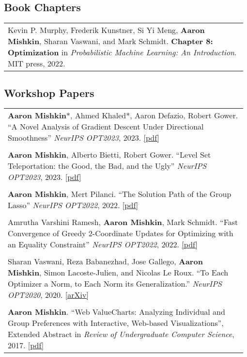 \documentclass[10pt]{article}
\begin{document}
\subsection*{Book Chapters}

\begin{longtable}{L{0.98\linewidth}}
    Kevin P.
    Murphy, Frederik Kunstner, Si Yi Meng, \textbf{Aaron Mishkin}, Sharan Vaswani,
    and Mark Schmidt.
    \textbf{Chapter 8: Optimization} in \textit{Probabilistic Machine Learning: An
        Introduction}.
    MIT press, 2022.
\end{longtable}

\subsection*{Workshop Papers}

\begin{longtable}{L{0.98\linewidth}}
    \textbf{Aaron Mishkin}*, Ahmed Khaled*, Aaron Defazio, Robert Gower. ``A Novel Analysis of Gradient Descent Under Directional Smoothness'' \textit{NeurIPS OPT2023}, 2023. \href{https://opt-ml.org/papers/2023/paper77.pdf}{[pdf]} \\  \\
    \textbf{Aaron Mishkin}, Alberto Bietti, Robert Gower. ``Level Set Teleportation: the Good, the Bad, and the Ugly'' \textit{NeurIPS OPT2023}, 2023. \href{https://opt-ml.org/papers/2023/paper35.pdf}{[pdf]}                         \\  \\
    \textbf{Aaron Mishkin}, Mert Pilanci. ``The Solution Path of the Group Lasso'' \textit{NeurIPS OPT2022}, 2022. \href{https://opt-ml.org/papers/2022/paper63.pdf}{[pdf]}                                                             \\  \\
    Amrutha Varshini Ramesh, \textbf{Aaron Mishkin}, Mark Schmidt.
    ``Fast Convergence of Greedy 2-Coordinate Updates for Optimizing with an Equality Constraint'' \textit{NeurIPS OPT2022}, 2022. \href{https://opt-ml.org/papers/2022/paper82.pdf}{[pdf]}                                             \\  \\
    Sharan Vaswani, Reza Babanezhad, Jose Gallego, \textbf{Aaron Mishkin}, Simon
    Lacoste-Julien, and Nicolas Le Roux.
    ``To Each Optimizer a Norm, to Each Norm its Generalization.'' \textit{NeurIPS OPT2020}, 2020. \href{https://arxiv.org/abs/2006.06821}{[arXiv]}                                                                                     \\  \\
    \textbf{Aaron Mishkin}. ``Web ValueCharts: Analyzing Individual and Group Preferences with Interactive, Web-based Visualizations'', Extended Abstract in \textit{Review of Undergraduate Computer Science}, 2017. \href{https://www.cs.ubc.ca/~amishkin/amishkinVCExtendedAbstract.pdf}{[pdf]}
\end{longtable}
\end{document}
